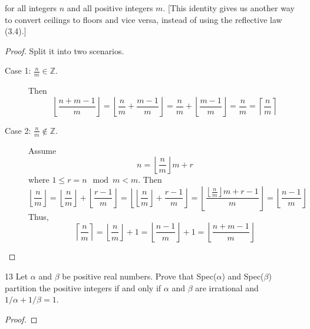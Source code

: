 \documentclass[a4paper,12pt]{article}
\theoremstyle{definition}
\newenvironment{problems}{\begin{list}{}{\renewcommand{\makelabel}[1]{\textbf{##1}\hfil}}}{\end{list}}
\begin{document}
\begin{problems}
\begin{equation*}
    \end{equation*} 
    for  all  integers $n$ and  all  positive  integers $m$.   [This  identity  gives  us another way to convert ceilings to floors and vice versa, instead of using the reflective law (3.4).]
    \begin{proof}
        Split it into two scenarios.
        \begin{description}
            \item[Case 1: $\frac{n}{m}\in\mathbb{Z}$.] Then
            \begin{equation*}
                \left\lfloor\frac{n+m-1}{m}\right\rfloor = \left\lfloor\frac{n}{m}+\frac{m-1}{m}\right\rfloor =
                \frac{n}{m} + \left\lfloor\frac{m-1}{m}\right\rfloor = \frac{n}{m} = \left\lceil \frac{n}{m}\right\rceil
            \end{equation*}  
            \item[Case 2: $\frac{n}{m}\not\in\mathbb{Z}$.] Assume 
            \begin{equation*}
                n=\left\lfloor\frac{n}{m}\right\rfloor m+r
            \end{equation*}
            where $1\leq r = n\mod m < m$. Then
            \begin{equation*}
                \left\lfloor \frac{n}{m}\right\rfloor = \left\lfloor \frac{n}{m}\right\rfloor + \left\lfloor \frac{r-1}{m}\right\rfloor = \left\lfloor \left\lfloor \frac{n}{m}\right\rfloor + \frac{r-1}{m}\right\rfloor = \left\lfloor \frac{\left\lfloor\frac{n}{m}\right\rfloor m+r-1}{m}\right\rfloor = \left\lfloor \frac{n-1}{m}\right\rfloor
            \end{equation*} 
            Thus,
            \begin{equation*}
                \left\lceil \frac{n}{m}\right\rceil = \left\lfloor \frac{n}{m}\right\rfloor + 1 = \left\lfloor \frac{n-1}{m}\right\rfloor + 1 = \left\lfloor \frac{n+m-1}{m}\right\rfloor
            \end{equation*}
        \end{description}
    \end{proof}
    \item[13]  Let $\alpha$ and $\beta$ be positive real numbers.  Prove that Spec($\alpha$) and Spec($\beta$) partition the positive integers if and only if $\alpha$ and $\beta$ are irrational and $1/\alpha+1/\beta=1$.
    \begin{proof}

\end{proof}
\end{problems}
\end{document}
